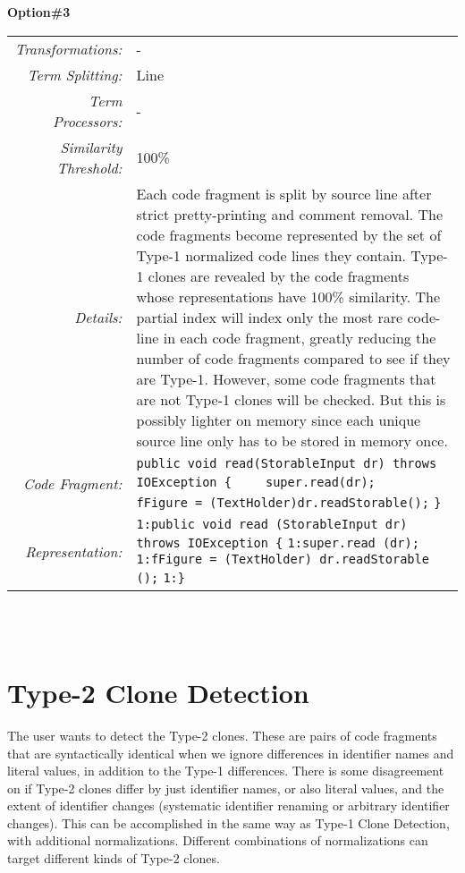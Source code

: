 \documentclass[]{article}
\begin{document}
	\noindent\begin{minipage}{\textwidth}
	\noindent \textbf{Option\#3}\\
	\begin{tabular}{rp{12.5cm}}
		\bottomrule[2pt]
		\textit{Transformations:} & - \\
		\textit{Term Splitting:}  & Line\\
		\textit{Term Processors:} & -\\
		\textit{Similarity Threshold:} & 100\% \\
		\midrule
		\textit{Details:}         & Each code fragment is split by source line after strict pretty-printing and comment removal.  The code fragments become represented by the set of Type-1 normalized code lines they contain.  Type-1 clones are revealed by the code fragments whose representations have 100\% similarity.  The partial index will index only the most rare code-line in each code fragment, greatly reducing the number of code fragments compared to see if they are Type-1.  However, some code fragments that are not Type-1 clones will be checked.  But this is possibly lighter on memory since each unique source line only has to be stored in memory once.\\
		\midrule
		\textit{Code Fragment:} & \verb|public void read(StorableInput dr) throws IOException {|\newline
		\verb|    super.read(dr);|\newline
		\verb|    fFigure = (TextHolder)dr.readStorable();|\newline
		\verb|}|\\
		\textit{Representation:} & \verb|1:public void read (StorableInput dr) throws IOException {|\newline
			                       \verb|1:super.read (dr);|\newline
			                       \verb|1:fFigure = (TextHolder) dr.readStorable ();|\newline
			                       \verb|1:}|\\
		\bottomrule[2pt]
	\end{tabular}
	\end{minipage}\\\\
	
	
	
	\newpage
	\section{Type-2 Clone Detection}
	The user wants to detect the Type-2 clones.  These are pairs of code fragments that are syntactically identical when we ignore differences in identifier names and literal values, in addition to the Type-1 differences.  There is some disagreement on if Type-2 clones differ by just identifier names, or also literal values, and the extent of identifier changes (systematic identifier renaming or arbitrary identifier changes).  This can be accomplished in the same way as Type-1 Clone Detection, with additional normalizations.  Different combinations of normalizations can target different kinds of Type-2 clones.\\
	
\end{document}
